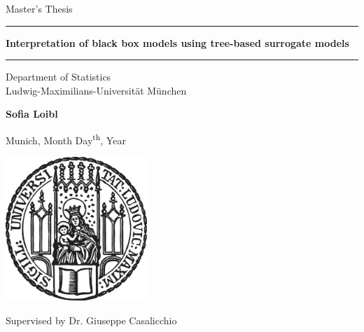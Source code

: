 \documentclass[12pt]{article}
\newcommand{\mytitle}{Interpretation of black box models using tree-based surrogate models}
\newcommand{\myname}{Sofia Loibl}
\newcommand{\mysupervisor}{Dr. Giuseppe Casalicchio}
\begin{document}
 
\begin{titlepage}
\begin{center}
    
\LARGE
Master's Thesis
    
\vspace{0.5cm}
      
\rule{\textwidth}{1.5pt}
\LARGE
\textbf{\mytitle}
\rule{\textwidth}{1.5pt}
   
\vspace{0.5cm}
      
\large
Department of Statistics \\
Ludwig-Maximilians-Universität München 

\vfill

\Large
\textbf{\myname}

\vfill

\large
Munich, Month Day\textsuperscript{th}, Year
      
\vfill

\includegraphics[width = 0.4\textwidth]{sigillum.png}

\vfill

\normalsize
Supervised by \mysupervisor

\end{center}
\end{titlepage}


\newpage

\begin{abstract}

Surrogate models allow complex but powerful black box machine learning models to be interpreted retrospectively. In this work, the following requirements are placed on a surrogate model: It should divide the feature space in subregions where interpretable models that only include main effects can approximate the black box model. In this way, both good interpretability and high performance should be achieved. For the generation of such models, four different algorithms for the generation of model-based trees are compared: SLIM, GUIDE, MOB and CTree. Selection bias, performance, interpretability and stability of the different methods are investigated. In the presence of subgroup-specific main effects, SLIM and GUIDE convince with their results regarding interpretability and performance.

\end{abstract}
\end{document}
